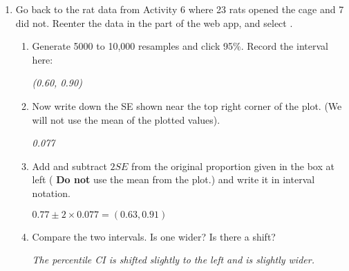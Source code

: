 \begin{enumerate}
\item Go back to the rat data from Activity 6 where 23 rats opened the
  cage and 7 did not.  Reenter the data in the  part
  of the web app, and select . 
  \begin{enumerate}
  \item Generate 5000 to 10,000 resamples and click 95\%. Record the
    interval here:
\begin{students}
\vspace{.8cm}
\end{students}

\begin{key}
  {\em (0.60, 0.90)}
\end{key}
\item Now write down the SE shown near the top right corner of the
  plot.  (We will not use the mean of the plotted values).
\begin{students}
\vspace{.8cm}
\end{students}

\begin{key}
  {\em 0.077}
\end{key}
\item Add and subtract $2SE$ from the original proportion given in the
  box at left ( {\bf Do not} use the mean from the plot.) and write it
  in interval notation.

\begin{students}
\vspace{.8cm}
\end{students}

\begin{key}
  {$ 0.77 \pm 2\times 0.077 =  (0.63, 0.91)$}
\end{key}
\item Compare the two intervals.  Is one wider? Is there a shift?

\begin{students}
\vspace{.8cm}
\end{students}

\begin{key}
  {\em The percentile CI is shifted slightly to the left and is
    slightly wider.}
\end{key}

  \end{enumerate}
\end{enumerate}

